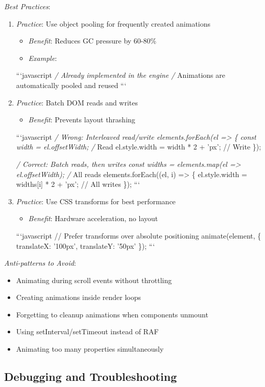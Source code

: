 \documentclass[11pt]{article}
\begin{document}
\emph{Best Practices}:

\begin{enumerate}
\item \emph{Practice}: Use object pooling for frequently created animations
\begin{itemize}
\item \emph{Benefit}: Reduces GC pressure by 60-80\%
\item \emph{Example}:
\end{itemize}
```javascript
\emph{/ Already implemented in the engine
/} Animations are automatically pooled and reused
```

\item \emph{Practice}: Batch DOM reads and writes
\begin{itemize}
\item \emph{Benefit}: Prevents layout thrashing
\end{itemize}
```javascript
\emph{/ Wrong: Interleaved read/write
elements.forEach(el => \{
  const width = el.offsetWidth; /} Read
  el.style.width = width * 2 + 'px'; // Write
\});

\emph{/ Correct: Batch reads, then writes
const widths = elements.map(el => el.offsetWidth); /} All reads
elements.forEach((el, i) => \{
  el.style.width = widths[i] * 2 + 'px'; // All writes
\});
```

\item \emph{Practice}: Use CSS transforms for best performance
\begin{itemize}
\item \emph{Benefit}: Hardware acceleration, no layout
\end{itemize}
```javascript
// Prefer transforms over absolute positioning
animate(element, \{
  translateX: '100px',
  translateY: '50px'
\});
```
\end{enumerate}

\emph{Anti-patterns to Avoid}:

\begin{itemize}
\item Animating during scroll events without throttling
\item Creating animations inside render loops
\item Forgetting to cleanup animations when components unmount
\item Using setInterval/setTimeout instead of RAF
\item Animating too many properties simultaneously
\end{itemize}
\subsection{Debugging and Troubleshooting}
\label{sec:orge52fc28}
\end{document}
